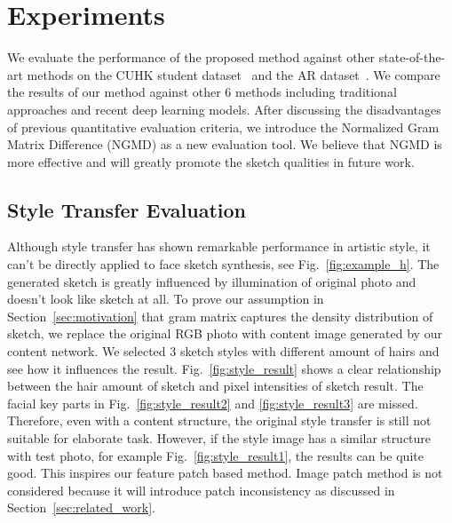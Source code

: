 \documentclass[10pt,twocolumn,letterpaper]{article}
\begin{document}
\section{Experiments}

We evaluate the performance of the proposed method against other state-of-the-art methods on the CUHK student dataset~\cite{wang2009face} and the AR dataset~\cite{martinez1998r}. We compare the results of our method against other 6 methods including traditional approaches and recent deep learning models. After discussing the disadvantages of previous quantitative evaluation criteria, we introduce the Normalized Gram Matrix Difference (NGMD) as a new evaluation tool. We believe that NGMD is more effective and will greatly promote the sketch qualities in future work.

\subsection{Style Transfer Evaluation} \label{subsec:style_transfer}

Although style transfer has shown remarkable performance in artistic style, it can't be directly applied to face sketch synthesis, see Fig.~\ref{fig:example_h}. The generated sketch is greatly influenced by illumination of original photo and doesn't look like sketch at all. To prove our assumption in Section~\ref{sec:motivation} that gram matrix captures the density distribution of sketch, we replace the original RGB photo with content image generated by our content network. We selected 3 sketch styles with different amount of hairs and see how it influences the result. Fig.~\ref{fig:style_result} shows a clear relationship between the hair amount of sketch and pixel intensities of sketch result. The facial key parts in Fig.~\ref{fig:style_result2} and \ref{fig:style_result3} are missed. Therefore, even with a content structure, the original style transfer is still not suitable for elaborate task. However, if the style image has a similar structure with test photo, for example Fig.~\ref{fig:style_result1}, the results can be quite good. This inspires our feature patch based method. Image patch method is not considered because it will introduce patch inconsistency as discussed in Section~\ref{sec:related_work}. 
\end{document}
